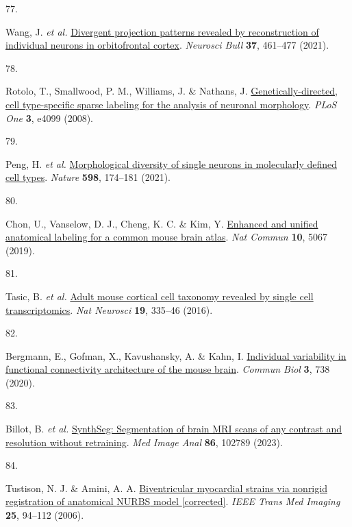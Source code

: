 \documentclass[
  12pt,
]{article}
\newlength{\cslhangindent}
\newlength{\csllabelwidth}
\newenvironment{CSLReferences}[2] %
 {\begin{list}{}{%
  \setlength{\itemindent}{0pt}
  \setlength{\leftmargin}{0pt}
  \setlength{\parsep}{0pt}
  \ifodd #1
   \setlength{\leftmargin}{\cslhangindent}
   \setlength{\itemindent}{-1\cslhangindent}
  \fi
  \setlength{\itemsep}{#2\baselineskip}}}
 {\end{list}}
\newcommand{\CSLLeftMargin}[1]{\parbox[t]{\csllabelwidth}{\strut#1\strut}}
\newcommand{\CSLRightInline}[1]{\parbox[t]{\linewidth - \csllabelwidth}{\strut#1\strut}}
\begin{document}
\begin{CSLReferences}{0}{0}
\CSLLeftMargin{77. }%
\CSLRightInline{Wang, J. \emph{et al.}
\href{https://doi.org/10.1007/s12264-020-00616-1}{Divergent projection
patterns revealed by reconstruction of individual neurons in
orbitofrontal cortex}. \emph{Neurosci Bull} \textbf{37}, 461--477
(2021).}

\CSLLeftMargin{78. }%
\CSLRightInline{Rotolo, T., Smallwood, P. M., Williams, J. \& Nathans,
J.
\href{https://doi.org/10.1371/journal.pone.0004099}{Genetically-directed,
cell type-specific sparse labeling for the analysis of neuronal
morphology}. \emph{PLoS One} \textbf{3}, e4099 (2008).}

\CSLLeftMargin{79. }%
\CSLRightInline{Peng, H. \emph{et al.}
\href{https://doi.org/10.1038/s41586-021-03941-1}{Morphological
diversity of single neurons in molecularly defined cell types}.
\emph{Nature} \textbf{598}, 174--181 (2021).}

\CSLLeftMargin{80. }%
\CSLRightInline{Chon, U., Vanselow, D. J., Cheng, K. C. \& Kim, Y.
\href{https://doi.org/10.1038/s41467-019-13057-w}{Enhanced and unified
anatomical labeling for a common mouse brain atlas}. \emph{Nat Commun}
\textbf{10}, 5067 (2019).}

\CSLLeftMargin{81. }%
\CSLRightInline{Tasic, B. \emph{et al.}
\href{https://doi.org/10.1038/nn.4216}{Adult mouse cortical cell
taxonomy revealed by single cell transcriptomics}. \emph{Nat Neurosci}
\textbf{19}, 335--46 (2016).}

\CSLLeftMargin{82. }%
\CSLRightInline{Bergmann, E., Gofman, X., Kavushansky, A. \& Kahn, I.
\href{https://doi.org/10.1038/s42003-020-01472-5}{Individual variability
in functional connectivity architecture of the mouse brain}.
\emph{Commun Biol} \textbf{3}, 738 (2020).}

\CSLLeftMargin{83. }%
\CSLRightInline{Billot, B. \emph{et al.}
\href{https://doi.org/10.1016/j.media.2023.102789}{SynthSeg:
Segmentation of brain MRI scans of any contrast and resolution without
retraining}. \emph{Med Image Anal} \textbf{86}, 102789 (2023).}

\CSLLeftMargin{84. }%
\CSLRightInline{Tustison, N. J. \& Amini, A. A.
\href{https://doi.org/10.1109/TMI.2005.861015}{Biventricular myocardial
strains via nonrigid registration of anatomical {NURBS} model
{[}corrected{]}}. \emph{IEEE Trans Med Imaging} \textbf{25}, 94--112
(2006).}


\end{CSLReferences}
\end{document}
